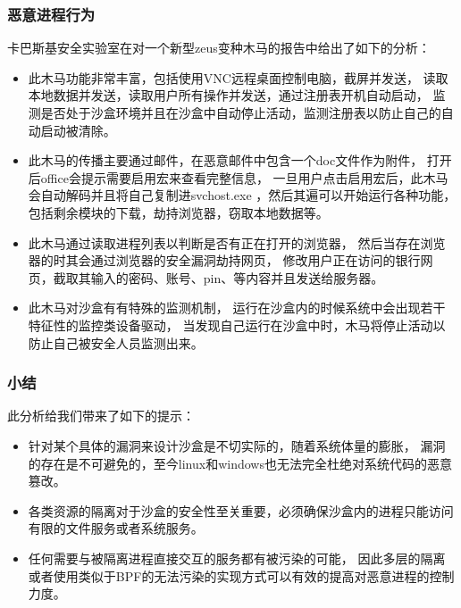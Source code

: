 \documentclass[AutoFakeBold,a4paper]{ctexart}
\begin{document}
\subsubsection{恶意进程行为}

卡巴斯基安全实验室在对一个新型zeus变种木马的报告中给出了如下的分析：\cite{ZeuS2018}

\begin{itemize}
    \item 此木马功能非常丰富，包括使用VNC远程桌面控制电脑，截屏并发送，
    读取本地数据并发送，读取用户所有操作并发送，通过注册表开机自动启动，
    监测是否处于沙盒环境并且在沙盒中自动停止活动，监测注册表以防止自己的自动启动被清除。

    \item 此木马的传播主要通过邮件，在恶意邮件中包含一个doc文件作为附件，
    打开后office会提示需要启用宏来查看完整信息，
    一旦用户点击启用宏后，此木马会自动解码并且将自己复制进svchost.exe
    ，然后其遍可以开始运行各种功能，包括剩余模块的下载，劫持浏览器，窃取本地数据等。
    
    \item 此木马通过读取进程列表以判断是否有正在打开的浏览器，
    然后当存在浏览器的时其会通过浏览器的安全漏洞劫持网页，
    修改用户正在访问的银行网页，截取其输入的密码、账号、pin、等内容并且发送给服务器。
    
    \item 此木马对沙盒有有特殊的监测机制，
    运行在沙盒内的时候系统中会出现若干特征性的监控类设备驱动，
    当发现自己运行在沙盒中时，木马将停止活动以防止自己被安全人员监测出来。
\end{itemize}

\subsubsection{小结}

此分析给我们带来了如下的提示：
\begin{itemize}
    \item 针对某个具体的漏洞来设计沙盒是不切实际的，随着系统体量的膨胀，
    漏洞的存在是不可避免的，至今linux和windows也无法完全杜绝对系统代码的恶意篡改。
    \item 各类资源的隔离对于沙盒的安全性至关重要，必须确保沙盒内的进程只能访问有限的文件服务或者系统服务。
    \item 任何需要与被隔离进程直接交互的服务都有被污染的可能，
    因此多层的隔离或者使用类似于BPF的无法污染的实现方式可以有效的提高对恶意进程的控制力度。
\end{itemize}
\end{document}
